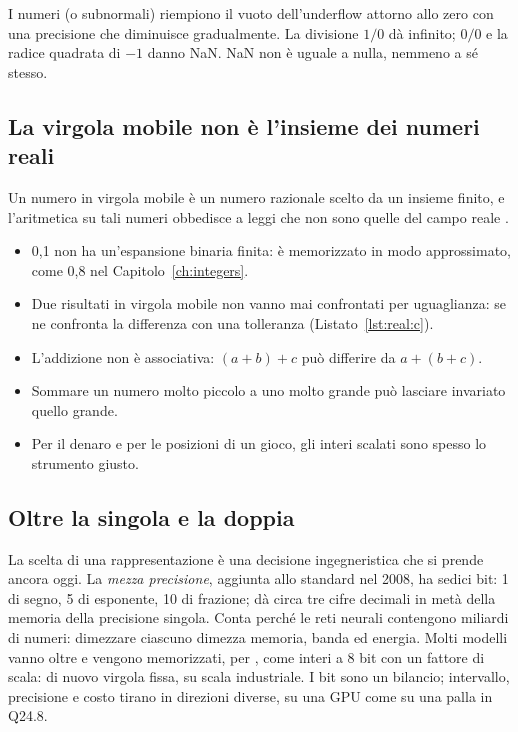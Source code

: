 I numeri  (o subnormali) riempiono il vuoto
dell'underflow attorno allo zero con una precisione che diminuisce
gradualmente. La divisione $1/0$ dà infinito; $0/0$ e la radice quadrata di
$-1$ danno NaN. NaN non è uguale a nulla, nemmeno a sé stesso.

\subsection{La virgola mobile non è l'insieme dei numeri reali}

Un numero in virgola mobile è un numero razionale scelto da un insieme finito,
e l'aritmetica su tali numeri obbedisce a leggi che non sono quelle del campo
reale \citep{goldberg1991}.

\begin{itemize}
\item 0,1 non ha un'espansione binaria finita: è memorizzato in modo
  approssimato, come 0,8 nel Capitolo~\ref{ch:integers}.
\item Due risultati in virgola mobile non vanno mai confrontati per
  uguaglianza: se ne confronta la differenza con una tolleranza
  (Listato~\ref{lst:real:c}).
\item L'addizione non è associativa: $(a+b)+c$ può differire da $a+(b+c)$.
\item Sommare un numero molto piccolo a uno molto grande può lasciare invariato
  quello grande.
\item Per il denaro e per le posizioni di un gioco, gli interi scalati sono
  spesso lo strumento giusto.
\end{itemize}


\subsection{Oltre la singola e la doppia}

La scelta di una rappresentazione è una decisione ingegneristica che si prende
ancora oggi. La \emph{mezza precisione}, aggiunta allo standard nel 2008, ha
sedici bit: 1 di segno, 5 di esponente, 10 di frazione; dà circa tre cifre
decimali in metà della memoria della precisione singola. Conta perché le reti
neurali contengono miliardi di numeri: dimezzare ciascuno dimezza memoria,
banda ed energia. Molti modelli vanno oltre e vengono memorizzati, per
, come interi a 8 bit con un fattore di scala: di nuovo
virgola fissa, su scala industriale. I bit sono un bilancio; intervallo,
precisione e costo tirano in direzioni diverse, su una GPU come su una palla in
Q24.8.

